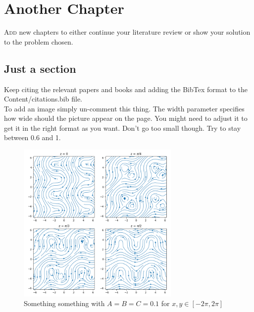 \chapter{Another Chapter}
\lettrine[lines=1]{A}{dd} new chapters to either continue your literature review or show your solution to the problem chosen. \cite{article1}

\section{Just a section}
Keep citing the relevant papers and books and adding the BibTex format to the Content/citations.bib file. \\[4pt]
To add an image simply un-comment this thing. The width parameter specifies how wide should the picture appear on the page. You might need to adjust it to get it in the right format as you want. Don't go too small though. Try to stay between 0.6 and 1.
\begin{figure}[ht!]
    \centering
    \includegraphics[width=0.7\textwidth]{Figures/ABC.png}
    \caption{Something something with $A = B = C = 0.1$ for $x, y \in [-2\pi, 2\pi]$}
    \label{ABC}
\end{figure}